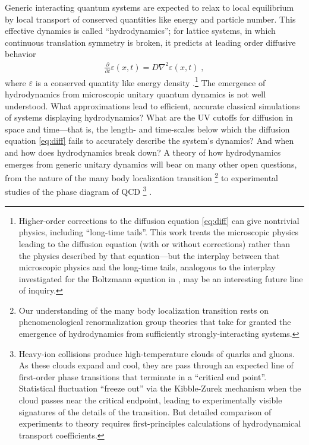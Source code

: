 \documentclass[aps,prb,nofootinbib,twocolumn,balancelastpage,amsmath,amssymb,floatfix,superscriptaddress,]{revtex4-1}
\begin{document}
Generic interacting quantum systems are expected to relax to local equilibrium by local transport of conserved quantities like energy and particle number.
This effective dynamics is called ``hydrodynamics'';
for lattice systems, in which continuous translation symmetry is broken,
it predicts at leading order diffusive behavior
\begin{align}
  \label{eq:diff}
  \frac{\partial}{\partial t} \varepsilon(x,t) = D \nabla^2 \varepsilon(x,t)\;,
\end{align}
where $\varepsilon$ is a conserved quantity like energy density
\cite{forster_hydrodynamic_1975,chaikin_principles_2000}%
.\footnote{
  Higher-order corrections to the diffusion equation \eqref{eq:diff}
  can give nontrivial physics,
  including ``long-time tails''\cite{kovtun_hydrodynamic_2003,mukerjee_towards_2006,spohn_nonlinear_2014,lux_hydrodynamic_2014,kirkpatrick_non-hydrodynamic_2021}.
  This work treats the microscopic physics leading to the diffusion equation (with or without corrections) rather than the physics described by that equation---but the interplay between that microscopic physics
  and the long-time tails,
  analogous to the interplay investigated for the Boltzmann equation in , may be an interesting future line of inquiry.
}
The emergence of hydrodynamics from microscopic unitary quantum dynamics is not well understood.
What approximations lead to efficient, accurate classical simulations of systems displaying hydrodynamics?
What are the UV cutoffs for diffusion in space and time---that is, the length- and time-scales below which the diffusion equation \eqref{eq:diff} fails to accurately describe the system's dynamics?
And when and how does hydrodynamics break down?
A theory of how hydrodynamics emerges from generic unitary dynamics will bear on many other open questions, from the nature of the many body localization transition
\footnote{Our understanding of the many body localization transition rests on phenomenological renormalization group theories that take for granted the emergence of hydrodynamics from sufficiently strongly-interacting systems.}
\cite{potter_universal_2015,vosk_theory_2015,dumitrescu_scaling_2017,goremykina_analytically_2018,morningstar_renormalization-group_2019,morningstar_many-body_2020,de_roeck_stability_2017,thiery_many-body_2017,thiery_microscopically_2017}
to experimental studies of the phase diagram of QCD
\footnote{Heavy-ion collisions produce high-temperature clouds of quarks and gluons.
  As these clouds expand and cool, they are pass through an expected line of first-order phase transitions that terminate in a ``critical end point''.
  Statistical fluctuation ``freeze out'' via the Kibble-Zurek mechanism when the cloud passes near the critical endpoint,
  leading to experimentally visible signatures of the details of the transition.
  But detailed comparison of experiments to theory requires first-principles calculations of hydrodynamical transport coefficients.
}
\cite{stephanov_signatures_1998,kolb_anisotropic_2000,ollitrault_anisotropy_1992,star_collaboration_experimental_2010,heinz_exploring_2015}
.
\end{document}

